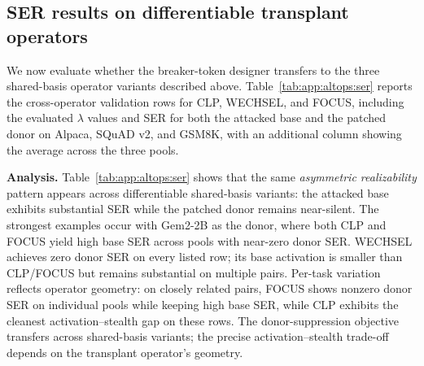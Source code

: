 \subsection{SER results on differentiable transplant operators}
\label{sec:altops-results}

We now evaluate whether the breaker-token designer transfers to the three shared-basis operator variants described above. Table~\ref{tab:app:altops:ser} reports the cross-operator validation rows for CLP, WECHSEL, and FOCUS, including the evaluated $\lambda$ values and SER for both the attacked base and the patched donor on Alpaca, SQuAD v2, and GSM8K, with an additional column showing the average across the three pools.



\noindent\textbf{Analysis.}
Table~\ref{tab:app:altops:ser} shows that the same \emph{asymmetric realizability} pattern appears across differentiable shared-basis variants: the attacked base exhibits substantial SER while the patched donor remains near-silent.
The strongest examples occur with Gem2-2B as the donor, where both CLP and FOCUS yield high base SER across pools with near-zero donor SER.
WECHSEL achieves zero donor SER on every listed row; its base activation is smaller than CLP/FOCUS but remains substantial on multiple pairs.
Per-task variation reflects operator geometry: on closely related pairs, FOCUS shows nonzero donor SER on individual pools while keeping high base SER, while CLP exhibits the cleanest activation--stealth gap on these rows.
The donor-suppression objective transfers across shared-basis variants; the precise activation--stealth trade-off depends on the transplant operator's geometry.
